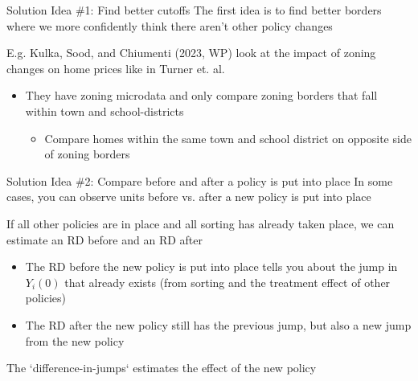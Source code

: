 \documentclass[aspectratio=169,t,11pt,table]{beamer}
\begin{document}
\begin{frame}{Solution Idea \#1: Find better cutoffs}
  The first idea is to find better borders where we more confidently think there aren't other policy changes

  \bigskip
  E.g. Kulka, Sood, and Chiumenti (2023, WP) look at the impact of zoning changes on home prices like in Turner et. al.
  \begin{itemize}
    \item They have zoning microdata and only compare zoning borders that fall within town and school-districts 
    \begin{itemize}
      \item Compare homes within the same town and school district on opposite side of zoning borders
    \end{itemize}
  \end{itemize}

\end{frame}

\begin{frame}{Solution Idea \#2: Compare before and after a policy is put into place}
  In some cases, you can observe units before vs. after a new policy is put into place

  \bigskip
  If all other policies are in place and all sorting has already taken place, we can estimate an RD before and an RD after
  \begin{itemize}
    \item The RD before the new policy is put into place tells you about the jump in $Y_i(0)$ that already exists (from sorting and the treatment effect of other policies)
    
    \pause
    \item The RD after the new policy still has the previous jump, but also a new jump from the new policy
  \end{itemize}

  \bigskip
  The `difference-in-jumps` estimates the effect of the new policy
\end{frame}
\end{document}
